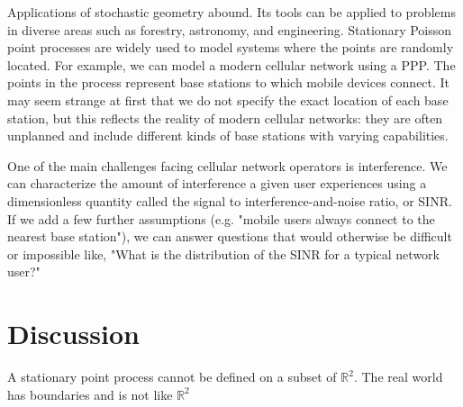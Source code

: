 \documentclass[]{article}
\begin{document}
Applications of stochastic geometry abound. Its tools can be applied to problems in diverse areas such as forestry, astronomy, and engineering. Stationary Poisson point processes are widely used to model systems where the points are randomly located. For example, we can model a modern cellular network using a PPP. The points in the process represent base stations to which mobile devices connect.  It may seem strange at first that we do not specify the exact location of each base station, but this reflects the reality of modern cellular networks: they are often unplanned and include different kinds of base stations with varying capabilities.

One of the main challenges facing cellular network operators is interference. We can characterize the amount of interference a given user experiences using a dimensionless quantity called the signal to interference-and-noise ratio, or SINR. If we add a few further assumptions (e.g. "mobile users always connect to the nearest base station"), we can answer questions that would otherwise be difficult or impossible like, "What is the distribution of the SINR for a typical network user?" 

 

\section{Discussion}
 A stationary point process cannot be defined on a subset of $\mathbb{R}^2$. The real world has boundaries and is not like $\mathbb{R}^2$
\end{document}
